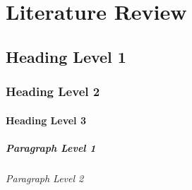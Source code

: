 \cleardoublepage
\chapter{Literature Review}
\label{chap:2}

\section{Heading Level 1}

\subsection{Heading Level 2}

\subsubsection{Heading Level 3}

\paragraph{Paragraph Level 1}

\subparagraph{Paragraph Level 2}
